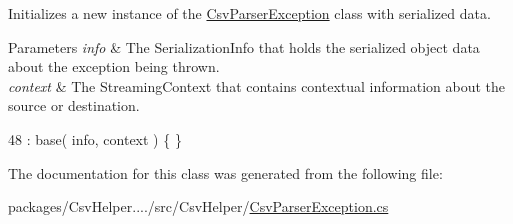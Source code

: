Initializes a new instance of the \hyperlink{a00047}{Csv\-Parser\-Exception} class with serialized data. 


\begin{DoxyParams}{Parameters}
{\em info} & The Serialization\-Info that holds the serialized object data about the exception being thrown.\\
\hline
{\em context} & The Streaming\-Context that contains contextual information about the source or destination.\\
\hline
\end{DoxyParams}

\begin{DoxyCode}
48 : base( info, context ) \{ \}
\end{DoxyCode}


The documentation for this class was generated from the following file\-:\begin{DoxyCompactItemize}
\item 
packages/\-Csv\-Helper..../src/\-Csv\-Helper/\hyperlink{a00198}{Csv\-Parser\-Exception.\-cs}\end{DoxyCompactItemize}
